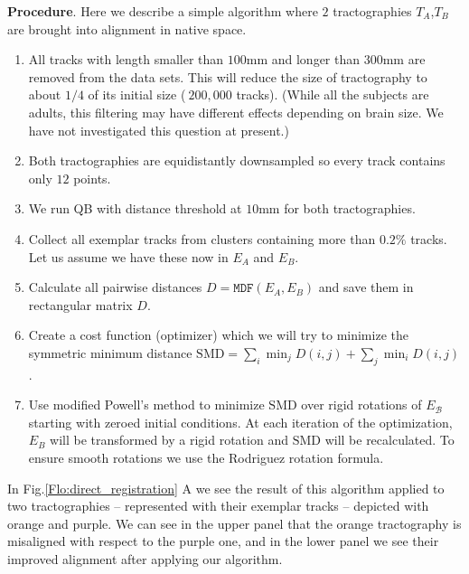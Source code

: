 \documentclass[preprint,authoryear,a4paper,10pt,onecolumn]{elsarticle}
\begin{document}
\textbf{Procedure}. Here we describe a simple algorithm where $2$
tractographies $T_{A}$,$T_{B}$ are brought into alignment in native
space.
\begin{enumerate}
\item All tracks with length smaller than $100$mm and longer than $300$mm
are removed from the data sets. This will reduce the size of tractography
to about $1/4$ of its initial size ($~200,000$ tracks). (While all
the subjects are adults, this filtering may have different effects
depending on brain size. We have not investigated this question at
present.)
\item Both tractographies are equidistantly downsampled so every track contains
only $12$ points. 
\item We run QB with distance threshold at $10$mm for both tractographies.
\item Collect all exemplar tracks from clusters containing more than $0.2\%$
tracks. Let us assume we have these now in $E_{A}$ and $E_{B}$.
\item Calculate all pairwise distances $D=\mathtt{MDF}(E_{A},E_{B})$ and
save them in rectangular matrix $D$. 
\item Create a cost function (optimizer) which we will try to minimize the
symmetric minimum distance $\mathrm{SMD}=\sum_{i}\min_{j}D(i,j)+\sum_{j}\min_{i}D(i,j)$
.
\item Use modified Powell's method \cite{fletcher1987practical} to minimize
$\mathrm{SMD}$ over rigid rotations of $E_{\mathcal{B}}$ starting
with zeroed initial conditions. At each iteration of the optimization,
$E_{B}$ will be transformed by a rigid rotation and $\mathrm{SMD}$
will be recalculated. To ensure smooth rotations we use the Rodriguez
rotation formula.
\end{enumerate}
In Fig.\ref{Flo:direct_registration} A we see the result of this
algorithm applied to two tractographies -- represented with their
exemplar tracks -- depicted with orange and purple. We can see in the
upper panel that the orange tractography is misaligned with respect to
the purple one, and in the lower panel we see their improved alignment
after applying our algorithm.
\end{document}
